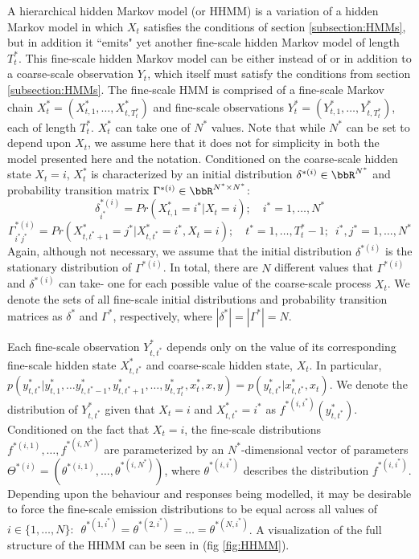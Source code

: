 A hierarchical hidden Markov model (or HHMM) is a variation of a hidden Markov model in which $X_t$ satisfies the conditions of section \ref{subsection:HMMs}, but in addition it ``emits" yet another fine-scale hidden Markov model of length $T_t^*$. This fine-scale hidden Markov model can be either instead of \cite{Barajas:2017} or in addition to \cite{Adam:2019} a coarse-scale observation $Y_t$, which itself must satisfy the conditions from section \ref{subsection:HMMs}. The fine-scale HMM is comprised of a fine-scale Markov chain $X^*_t = (X^*_{t,1}, \ldots, X^*_{t,T^*_t})$ and fine-scale observations $Y^*_t = (Y^*_{t,1}, \ldots, Y^*_{t,T^*_t})$, each of length $T^*_t$. $X^*_t$ can take one of $N^*$ values. Note that while $N^*$ can be set to depend upon $X_t$, we assume here that it does not for simplicity in both the model presented here and the notation. Conditioned on the coarse-scale hidden state $X_t = i$, $X^*_t$ is characterized by an initial distribution $\delta^{*(i)} \in \bbR^{N^*}$ and probability transition matrix $\Gamma^{*(i)} \in \bbR^{N^* \times N^*}$:
%
$$\delta^{*(i)}_{i^*} = Pr(X^*_{t,1} = i^* | X_t = i); \quad i^* = 1,\ldots,N^*$$
%
$$\Gamma^{*(i)}_{i^*j^*} = Pr(X^*_{t,t^*+1} = j^* | X^*_{t,t^*} = i^*, X_t = i); \quad t^* = 1, \ldots, T^*_t-1; \enspace i^*,j^* = 1,\ldots,N^*$$
%
Again, although not necessary, we assume that the initial distribution $\delta^{*(i)}$ is the stationary distribution of $\Gamma^{*(i)}$. In total, there are $N$ different values that $\Gamma^{*(i)}$ and $\delta^{*(i)}$ can take- one for each possible value of the coarse-scale process $X_t$. We denote the sets of all fine-scale initial distributions and probability transition matrices as $\delta^*$ and $\Gamma^*$, respectively, where $|\delta^*| = |\Gamma^*| = N$.

Each fine-scale observation $Y^*_{t,t^*}$ depends only on the value of its corresponding fine-scale hidden state $X^*_{t,t^*}$ and coarse-scale hidden state, $X_t$. In particular, $p(y^*_{t,t^*} | y^*_{t,1}, \ldots y^*_{t,t^*-1},y^*_{t,t^*+1},\ldots,y^*_{t,T^*_t},x^*_t,x,y) = p(y^*_{t,t^*}|x^*_{t,t^*},x_t)$. We denote the distribution of $Y^*_{t,t^*}$ given that $X_t = i$ and $X^*_{t,t^*} = i^*$ as $f^{*(i,i^*)}(y^*_{t,t^*})$. Conditioned on the fact that $X_t = i$, the fine-scale distributions $f^{*(i,1)}, \ldots, f^{*(i,N^*)}$ are parameterized by an $N^*$-dimensional vector of parameters $\Theta^{*(i)} = (\theta^{*(i,1)},\ldots,\theta^{*(i,N^*)})$, where $\theta^{*(i,i^*)}$ describes the distribution $f^{*(i,i^*)}$. Depending upon the behaviour and responses being modelled, it may be desirable to force the fine-scale emission distributions to be equal across all values of $i \in \{1, \ldots, N\}: \enspace \theta^{*(1,i^*)} = \theta^{*(2,i^*)} = \ldots = \theta^{*(N,i^*)}$. A visualization of the full structure of the HHMM can be seen in (fig \ref{fig:HHMM}). 

